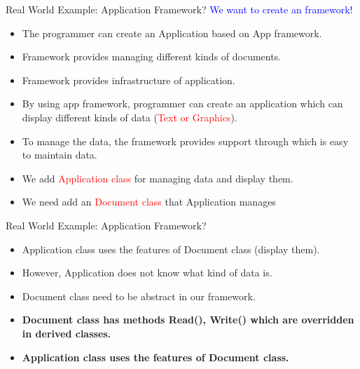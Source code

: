 \documentclass[13pt]{beamer}
\begin{document}
\begin{frame}{Real World Example: Application Framework?}
	\textcolor{blue}{We want to create an framework!}	
	\begin{itemize}
		\setlength\itemsep{1em}
		\item The programmer can create an Application based on App framework.
		\item Framework provides managing different kinds of documents.
		\item Framework provides infrastructure of application.
		\item By using app framework, programmer can create an application which can display different kinds of data (\textcolor{red}{Text or Graphics}).
		\item To manage the data, the framework provides support through which is easy to maintain data.
		\item We add \textcolor{red}{Application class} for managing data and display them.
		\item We need add an \textcolor{red}{Document class} that Application manages
	\end{itemize}
\end{frame}

\begin{frame}{Real World Example: Application Framework?}
\begin{itemize}
	\setlength\itemsep{1em}
	\item Application class uses the features of Document class (display them).
	\item However, Application does not know what kind of data is.
	\item Document class need to be abstract in our framework.
	\item \textbf{Document class has methods Read(), Write() which are overridden in derived classes.}
	\item \textbf{Application class uses the features of Document class.}
\end{itemize}
\begin{center}
\end{center}
\end{frame}
\end{document}
